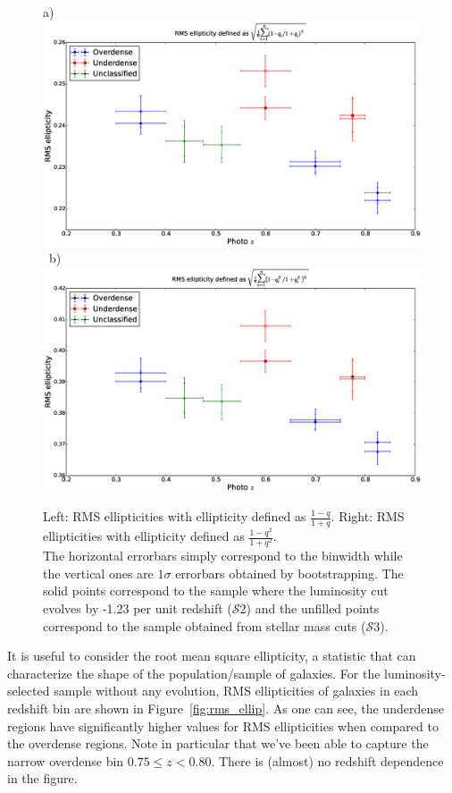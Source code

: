 \documentclass[twocolumn,useAMS,usenatbib]{mn2e}
\newcommand{\s}{\ensuremath{\mathcal{S}}}
\begin{document}
\begin{figure}
 \centering
 a) \includegraphics[width=0.9\columnwidth]{rms_ellip1_Bbandevolution_masscut.eps} \
 b) \includegraphics[width=0.9\columnwidth]{rms_ellip2_Bbandevolution_masscut.eps} \\
 \caption{Left: RMS ellipticities with ellipticity defined as $\frac{1-q}{1+q}$. \; 
          Right: RMS ellipticities with ellipticity defined as $\frac{1-q^2}{1+q^2}$.\\ The horizontal errorbars simply correspond to the binwidth while the vertical ones
          are $1\sigma$ errorbars obtained by bootstrapping. The solid points correspond to the sample where the luminosity cut evolves by -1.23 per unit redshift (\s$2$) and the unfilled
          points correspond to the sample obtained from stellar mass cuts (\s$3$).}
 \label{fig:rms_ellip_Bband_mass}
\end{figure}

It is useful to consider the root mean square ellipticity, a statistic that can characterize the shape of the population/sample of galaxies.
For the luminosity-selected sample without any evolution, RMS ellipticities of galaxies in each redshift bin are shown in Figure~\ref{fig:rms_ellip}. As one can see, the underdense regions
have significantly higher values for RMS ellipticities when compared to the overdense regions. Note in particular that we've been able to capture the narrow overdense bin $0.75\le z < 0.80$.  
There is (almost) no redshift dependence in the figure.
\end{document}
